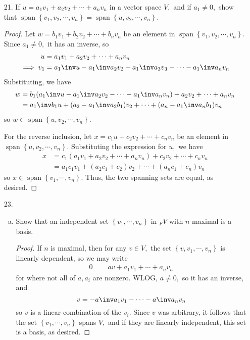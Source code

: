 \documentclass{article}
\DeclareMathOperator{\spn}{span}
\begin{document}
\begin{itemize}
	\item[21.] If $u=a_1v_1+a_2v_2+\cdots+a_nv_n$ in a vector space $V,$ and if $a_1\neq 0,$ show that $\spn\left\{ v_1, v_2, \cdots, v_n \right\}=\spn\left\{ u, v_2, \cdots, v_n \right\}.$
		\begin{proof}
			Let $w=b_1v_1+b_2v_2+\cdots+b_nv_n$ be an element in $\spn\left\{ v_1, v_2, \cdots, v_n \right\}.$ Since $a_1\neq 0,$ it has an inverse, so
			\begin{align*}
				u &= a_1v_1 + a_2v_2 + \cdots + a_nv_n \\
				\implies v_1 &= a_1\inv u-a_1\inv a_2v_2 - a_1\inv a_3 v_3 - \cdots - a_1\inv a_n v_n
			\end{align*}
			Substituting, we have
			\begin{align*}
				w &= b_1(a_1\inv u-a_1\inv a_2v_2 - \cdots - a_1\inv a_n v_n) + a_2v_2 + \cdots + a_nv_n \\
				&= a_1\inv b_1 u + (a_2-a_1\inv a_2 b_1)v_2 + \cdots + (a_n-a_1\inv a_n b_1) v_n
			\end{align*}
			so $w\in\spn\left\{ u, v_2, \cdots, v_n \right\}.$

			For the reverse inclusion, let $x=c_1u+c_2v_2+\cdots+c_nv_n$ be an element in $\spn\left\{ u, v_2, \cdots, v_n \right\}.$ Substituting the expression for $u,$ we have
			\begin{align*}
				x &= c_1(a_1v_1+a_2v_2+\cdots+a_nv_n) + c_2v_2 + \cdots + c_nv_n \\
				&= a_1c_1 v_1 + (a_2c_1+c_2) v_2 + \cdots + (a_nc_1+c_n)v_n
			\end{align*}
			so $x\in \spn\left\{ v_1, \cdots, v_n \right\}.$ Thus, the two spanning sets are equal, as desired.
		\end{proof}

	\item[23.] 
		\begin{enumerate}[(a)]
			\item Show that an independent set $\left\{ v_1, \cdots, v_n \right\}$ in $_F V$ with $n$ maximal is a basis. 
				\begin{proof}
					If $n$ is maximal, then for any $v\in V,$ the set $\left\{ v, v_1, \cdots, v_n \right\}$ is linearly dependent, so we may write
					\begin{align*}
						0 &= av + a_1v_1+\cdots+a_nv_n
					\end{align*}
					for where not all of $a, a_i$ are nonzero. WLOG, $a\neq 0,$ so it has an inverse, and
					\[v = -a\inv a_1v_1 - \cdots - a\inv a_n v_n\]
					so $v$ is a linear combination of the $v_i.$ Since $v$ was arbitrary, it follows that the set $\left\{ v_1, \cdots, v_n \right\}$ spans $V,$ and if they are linearly independent, this set is a basis, as desired.
				\end{proof}


\end{enumerate}
\end{itemize}
\end{document}
